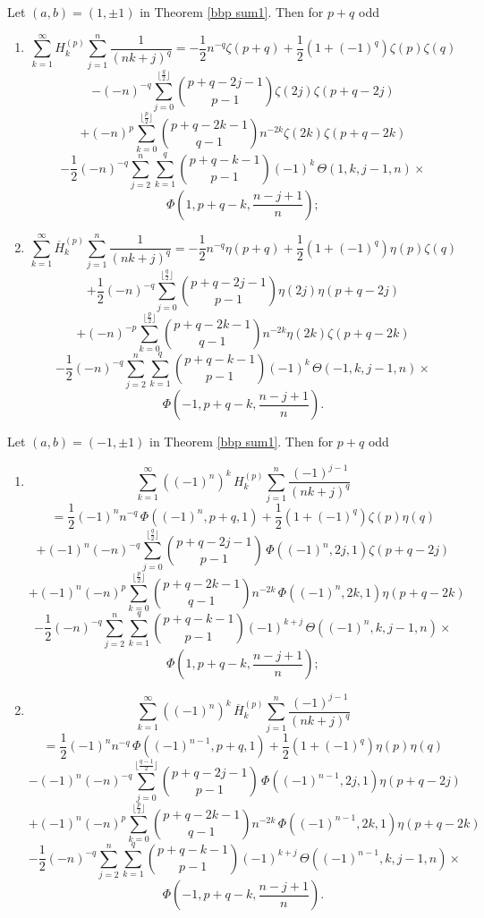 \documentclass[11pt,reqno]{article}
\begin{document}
\begin{corollary} Let $(a,b)=(1,\pm1)$ in Theorem \ref{bbp sum1}. Then for $p+q$ odd
	\begin{enumerate}
		\item[i)]		 		
		\[\sum_{k=1}^\infty  H_k^{(p)}\sum_{j=1}^{n}\frac{1}{(nk+j)^q}=-\frac12 n^{-q}\zeta(p+q)+\frac12(1+{(-1)}^{q})\zeta(p)\zeta(q)\]
		\[-{(-n)}^{-q}\sum_{j=0}^{\lfloor\frac{q}{2}\rfloor}\binom{p+q-2j-1}{p-1}\zeta(2j)\zeta(p+q-2j)\]
		\[+{(-n)}^{p}\sum_{k=0}^{\lfloor\frac{p}{2}\rfloor}\binom{p+q-2k-1}{q-1}n^{-2k}\zeta(2k)\zeta(p+q-2k)\]
		\[-\frac12 {(-n)}^{-q}\sum_{j=2}^{n}\sum_{k=1}^{q}\binom{p+q-k-1}{p-1}{(-1)}^{k}\,\Theta(1,k,j-1,n)\times\]
		\[\Phi\left(1,p+q-k,\frac{n-j+1}{n}\right);\]
		\item[ii)]			
		\[\sum_{k=1}^\infty  \overline{H}_k^{(p)}\sum_{j=1}^{n}\frac{1}{(nk+j)^q}=-\frac12  n^{-q}\eta(p+q)+\frac12(1+{(-1)}^{q})\eta(p)\zeta(q)\]
		\[+\frac{1}{2} {(-n)}^{-q}\sum_{j=0}^{\lfloor\frac{q}{2}\rfloor}\binom{p+q-2j-1}{p-1}\eta(2j)\eta(p+q-2j)\]
		\[+{(-n)}^{-p}\sum_{k=0}^{\lfloor\frac{p}{2}\rfloor}\binom{p+q-2k-1}{q-1}n^{-2k}\eta(2k)\zeta(p+q-2k)\]
		\[-\frac12 {(-n)}^{-q}\sum_{j=2}^{n}\sum_{k=1}^{q}\binom{p+q-k-1}{p-1}{(-1)}^{k}\,\Theta(-1,k,j-1,n)\times\]
		\[\Phi\left(-1,p+q-k,\frac{n-j+1}{n}\right).\]	
	\end{enumerate}
\end{corollary}
\begin{corollary} Let $(a,b)=(-1,\pm1)$ in Theorem \ref{bbp sum1}. Then for $p+q$ odd 	
	\begin{enumerate}
		\item[i)]
		\[\sum_{k=1}^\infty {({(-1)}^{n})}^{k}\, H_k^{(p)}\sum_{j=1}^{n}\frac{{(-1)}^{j-1}}{(nk+j)^q}\]
		\[=\frac12 {(-1)}^{n}n^{-q}\,\Phi({(-1)}^{n},p+q,1)+\frac12(1+{(-1)}^{q})\zeta(p)\eta(q)\]
		\[+{(-1)}^{n}{(-n)}^{-q}\sum_{j=0}^{\lfloor\frac{q}{2}\rfloor}\binom{p+q-2j-1}{p-1}\,\Phi({(-1)}^{n},2j,1)\zeta(p+q-2j)\]
		\[+{(-1)}^{n}{(-n)}^{p}\sum_{k=0}^{\lfloor\frac{p}{2}\rfloor}\binom{p+q-2k-1}{q-1}n^{-2k}\,\Phi({(-1)}^{n},2k,1)\eta(p+q-2k)\]
		\[-\frac12 {(-n)}^{-q}\sum_{j=2}^{n}\sum_{k=1}^{q}\binom{p+q-k-1}{p-1}{(-1)}^{k+j}\,\Theta({(-1)}^{n},k,j-1,n)\times\]
		\[\Phi\left(1,p+q-k,\frac{n-j+1}{n}\right);\]
		\item[ii)]			
		\[\sum_{k=1}^\infty {({(-1)}^{n})}^{k}\, \overline{H}_k^{(p)}\sum_{j=1}^{n}\frac{{(-1)}^{j-1}}{(nk+j)^q}\]
		\[=\frac12 {(-1)}^{n} n^{-q}\,\Phi({(-1)}^{n-1},p+q,1)+\frac12(1+{(-1)}^{q})\eta(p)\eta(q)\]
		\[-{(-1)}^{n}{(-n)}^{-q} \sum_{j=0}^{\lfloor\frac{q-1}{2}\rfloor}\binom{p+q-2j-1}{p-1}\,\Phi({(-1)}^{n-1},2j,1)\eta(p+q-2j)\]
		\[+{(-1)}^{n}{(-n)}^{p}\sum_{k=0}^{\lfloor\frac{p}{2}\rfloor}\binom{p+q-2k-1}{q-1}n^{-2k}\,\Phi({(-1)}^{n-1},2k,1)\eta(p+q-2k)\]
		\[-\frac12{(-n)}^{-q}\sum_{j=2}^{n}\sum_{k=1}^{q}\binom{p+q-k-1}{p-1}{(-1)}^{k+j}\,\Theta({(-1)}^{n-1},k,j-1,n)\times\]
		\[\Phi\left(-1,p+q-k,\frac{n-j+1}{n}\right).\]
	\end{enumerate}			
\end{corollary}
\end{document}
